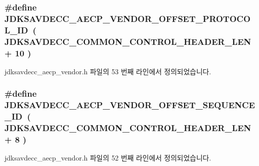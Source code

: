 \subsubsection[{\texorpdfstring{J\+D\+K\+S\+A\+V\+D\+E\+C\+C\+\_\+\+A\+E\+C\+P\+\_\+\+V\+E\+N\+D\+O\+R\+\_\+\+O\+F\+F\+S\+E\+T\+\_\+\+P\+R\+O\+T\+O\+C\+O\+L\+\_\+\+ID}{JDKSAVDECC_AECP_VENDOR_OFFSET_PROTOCOL_ID}}]{\setlength{\rightskip}{0pt plus 5cm}\#define J\+D\+K\+S\+A\+V\+D\+E\+C\+C\+\_\+\+A\+E\+C\+P\+\_\+\+V\+E\+N\+D\+O\+R\+\_\+\+O\+F\+F\+S\+E\+T\+\_\+\+P\+R\+O\+T\+O\+C\+O\+L\+\_\+\+ID~( {\bf J\+D\+K\+S\+A\+V\+D\+E\+C\+C\+\_\+\+C\+O\+M\+M\+O\+N\+\_\+\+C\+O\+N\+T\+R\+O\+L\+\_\+\+H\+E\+A\+D\+E\+R\+\_\+\+L\+EN} + 10 )}\hypertarget{group__aecp__vendor_gaabcbf488c312106438cf554c418de5d1}{}\label{group__aecp__vendor_gaabcbf488c312106438cf554c418de5d1}


jdksavdecc\+\_\+aecp\+\_\+vendor.\+h 파일의 53 번째 라인에서 정의되었습니다.

\subsubsection[{\texorpdfstring{J\+D\+K\+S\+A\+V\+D\+E\+C\+C\+\_\+\+A\+E\+C\+P\+\_\+\+V\+E\+N\+D\+O\+R\+\_\+\+O\+F\+F\+S\+E\+T\+\_\+\+S\+E\+Q\+U\+E\+N\+C\+E\+\_\+\+ID}{JDKSAVDECC_AECP_VENDOR_OFFSET_SEQUENCE_ID}}]{\setlength{\rightskip}{0pt plus 5cm}\#define J\+D\+K\+S\+A\+V\+D\+E\+C\+C\+\_\+\+A\+E\+C\+P\+\_\+\+V\+E\+N\+D\+O\+R\+\_\+\+O\+F\+F\+S\+E\+T\+\_\+\+S\+E\+Q\+U\+E\+N\+C\+E\+\_\+\+ID~( {\bf J\+D\+K\+S\+A\+V\+D\+E\+C\+C\+\_\+\+C\+O\+M\+M\+O\+N\+\_\+\+C\+O\+N\+T\+R\+O\+L\+\_\+\+H\+E\+A\+D\+E\+R\+\_\+\+L\+EN} + 8 )}\hypertarget{group__aecp__vendor_gad7cb4c2aee7217166a1d64ff3939ded9}{}\label{group__aecp__vendor_gad7cb4c2aee7217166a1d64ff3939ded9}


jdksavdecc\+\_\+aecp\+\_\+vendor.\+h 파일의 52 번째 라인에서 정의되었습니다.

